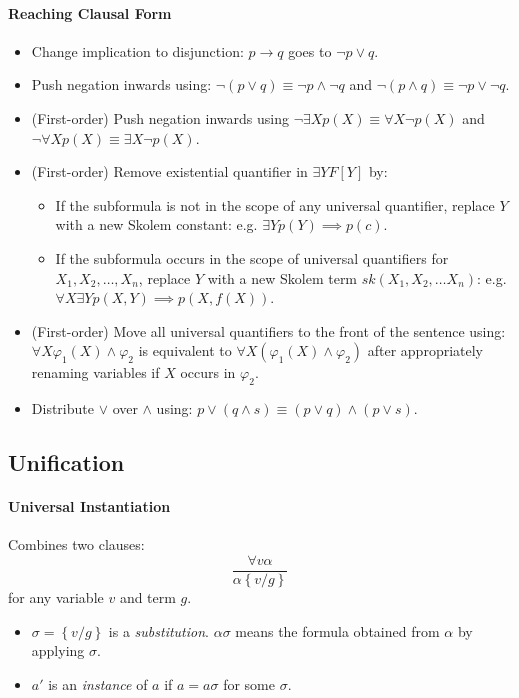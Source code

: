 \documentclass[twocolumn,english]{article}
\begin{document}
\paragraph{Reaching Clausal Form}
\begin{itemize}
\item Change implication to disjunction: $p\rightarrow q$ goes to $\lnot p\lor q$.
\item Push negation inwards using: $\lnot\left(p\lor q\right)\equiv\lnot p\land\lnot q$
and $\lnot\left(p\land q\right)\equiv\lnot p\lor\lnot q$.
\item (First-order) Push negation inwards using $\lnot\exists Xp\left(X\right)\equiv\forall X\lnot p\left(X\right)$
and $\lnot\forall Xp\left(X\right)\equiv\exists X\lnot p\left(X\right)$.
\item (First-order) Remove existential quantifier in $\exists YF\left[Y\right]$
by:
\begin{itemize}
\item If the subformula is not in the scope of any universal quantifier,
replace $Y$ with a new Skolem constant: e.g. $\exists Yp\left(Y\right)\implies p\left(c\right)$.
\item If the subformula occurs in the scope of universal quantifiers for
$X_{1},X_{2},\dots,X_{n}$, replace $Y$ with a new Skolem term $sk\left(X_{1},X_{2},\dots X_{n}\right)$:
e.g. $\forall X\exists Yp\left(X,Y\right)\implies p\left(X,f\left(X\right)\right)$.
\end{itemize}
\item (First-order) Move all universal quantifiers to the front of the sentence
using: $\forall X\varphi_{1}\left(X\right)\land\varphi_{2}$ is equivalent
to $\forall X\left(\varphi_{1}\left(X\right)\land\varphi_{2}\right)$
after appropriately renaming variables if $X$ occurs in $\varphi_{2}$.
\item Distribute $\lor$ over $\land$ using: $p\lor\left(q\land s\right)\equiv\left(p\lor q\right)\land\left(p\lor s\right)$.
\end{itemize}

\subsection{Unification}

\paragraph{Universal Instantiation}

Combines two clauses:
\[
\dfrac{\forall v\alpha}{\alpha\left\{ v/g\right\} }
\]
for any variable $v$ and term $g$.
\begin{itemize}
\item $\sigma=\left\{ v/g\right\} $ is a \emph{substitution}. $\alpha\sigma$
means the formula obtained from $\alpha$ by applying $\sigma$.
\item $a'$ is an \emph{instance} of $a$ if $a=a\sigma$ for some $\sigma$.
\end{itemize}
\end{document}
